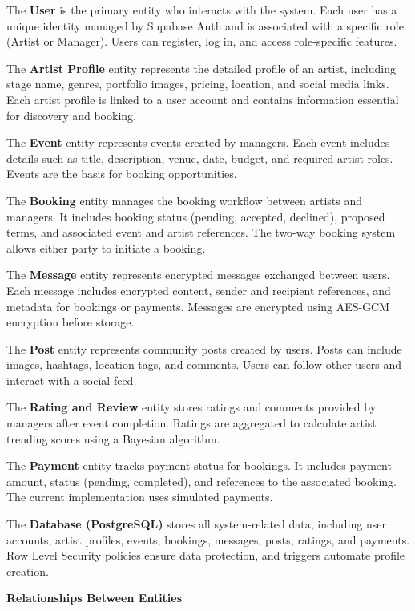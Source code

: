 \documentclass[12pt,a4paper]{report}
\begin{document}
The \textbf{User} is the primary entity who interacts with the system. Each user has a unique identity managed by Supabase Auth and is associated with a specific role (Artist or Manager). Users can register, log in, and access role-specific features.

The \textbf{Artist Profile} entity represents the detailed profile of an artist, including stage name, genres, portfolio images, pricing, location, and social media links. Each artist profile is linked to a user account and contains information essential for discovery and booking.

The \textbf{Event} entity represents events created by managers. Each event includes details such as title, description, venue, date, budget, and required artist roles. Events are the basis for booking opportunities.

The \textbf{Booking} entity manages the booking workflow between artists and managers. It includes booking status (pending, accepted, declined), proposed terms, and associated event and artist references. The two-way booking system allows either party to initiate a booking.

The \textbf{Message} entity represents encrypted messages exchanged between users. Each message includes encrypted content, sender and recipient references, and metadata for bookings or payments. Messages are encrypted using AES-GCM encryption before storage.

The \textbf{Post} entity represents community posts created by users. Posts can include images, hashtags, location tags, and comments. Users can follow other users and interact with a social feed.

The \textbf{Rating and Review} entity stores ratings and comments provided by managers after event completion. Ratings are aggregated to calculate artist trending scores using a Bayesian algorithm.

The \textbf{Payment} entity tracks payment status for bookings. It includes payment amount, status (pending, completed), and references to the associated booking. The current implementation uses simulated payments.

The \textbf{Database (PostgreSQL)} stores all system-related data, including user accounts, artist profiles, events, bookings, messages, posts, ratings, and payments. Row Level Security policies ensure data protection, and triggers automate profile creation.

\textbf{Relationships Between Entities}
\end{document}
